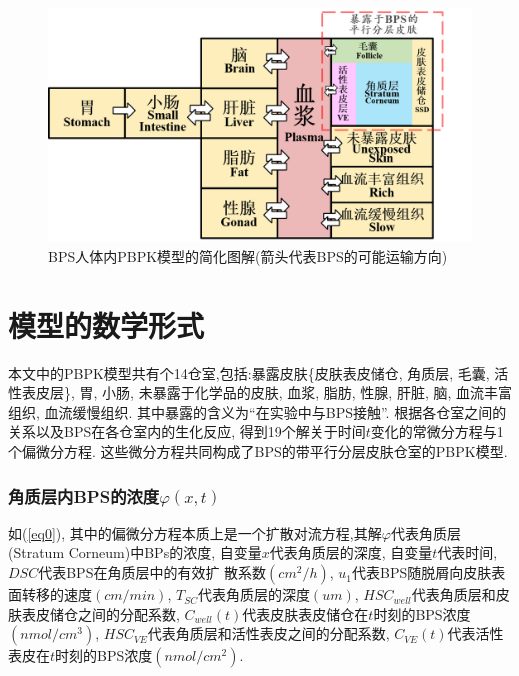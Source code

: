 \documentclass[a4paper,punct=banjiao,twoside]{ctexrep}
\theoremstyle{plain}
\theoremstyle{definition}
\theoremstyle{remark}
\begin{document}
\begin{figure}[H]
  \centering
  \includegraphics[scale=0.6]{./figs/p2.png}
  \caption{BPS人体内PBPK模型的简化图解(箭头代表BPS的可能运输方向)}
  \label{模型图解}
\end{figure}
\section{模型的数学形式}
本文中的PBPK模型共有个14仓室,包括:暴露皮肤\{皮肤表皮储仓, 角质层, 毛囊, 活性表皮层\}, 胃, 小肠, 未暴露于化学品的皮肤, 血浆, 脂肪, 性腺, 肝脏, 脑, 血流丰富组织, 血流缓慢组织.
其中暴露的含义为“在实验中与BPS接触”.
根据各仓室之间的关系以及BPS在各仓室内的生化反应, 得到19个解关于时间$t$变化的常微分方程与1个偏微分方程. 这些微分方程共同构成了BPS的带平行分层皮肤仓室的PBPK模型.  

\subsubsection*{角质层内BPS的浓度$\varphi(x,t)$}
如(\ref{eq0}), 其中的偏微分方程本质上是一个扩散对流方程,其解$\varphi$代表角质层(Stratum Corneum)中BPs的浓度, 自变量$x$代表角质层的深度, 自变量$t$代表时间, $DSC$代表BPS在角质层中的有效扩
散系数$(cm^2/h)$, $u_1$代表BPS随脱屑向皮肤表面转移的速度$(cm/min)$, $T_{SC}$代表角质层的深度$(um)$, $HSC_{well}$代表角质层和皮肤表皮储仓之间的分配系数, 
$C_{well}(t)$代表皮肤表皮储仓在$t$时刻的BPS浓度$(nmol/cm^3)$, $HSC_{VE}$代表角质层和活性表皮之间的分配系数, $C_{VE}(t)$代表活性表皮在$t$时刻的BPS浓度$(nmol/cm^2)$.
\end{document}
